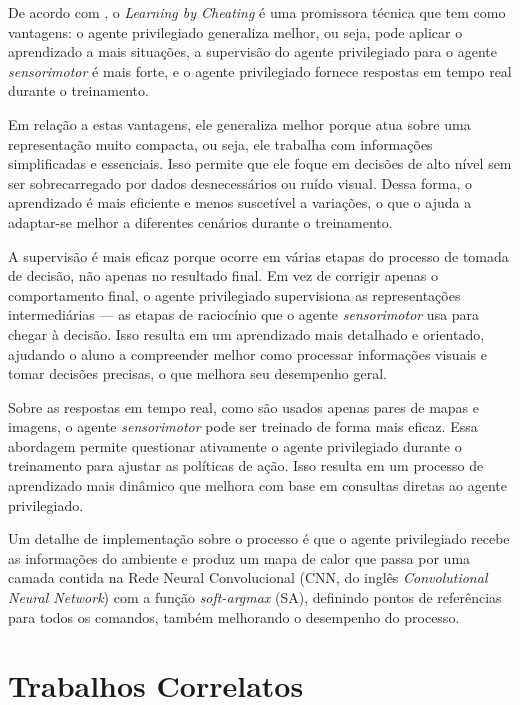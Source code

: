 \documentclass[a4paper,12pt,Times]{article}
\begin{document}
 De acordo com , o \textit{Learning by Cheating} é uma promissora técnica que tem como vantagens: o agente privilegiado generaliza melhor, ou seja, pode aplicar o aprendizado a mais situações, a supervisão do agente privilegiado para o agente \textit{sensorimotor} é mais forte, e o agente privilegiado fornece respostas em tempo real durante o treinamento.
 
 Em relação a estas vantagens, ele generaliza melhor porque atua sobre uma representação muito compacta, ou seja, ele trabalha com informações simplificadas e essenciais. Isso permite que ele foque em decisões de alto nível sem ser sobrecarregado por dados desnecessários ou ruído visual. Dessa forma, o aprendizado é mais eficiente e menos suscetível a variações, o que o ajuda a adaptar-se melhor a diferentes cenários durante o treinamento. 
 
 A supervisão é mais eficaz porque ocorre em várias etapas do processo de tomada de decisão, não apenas no resultado final. Em vez de corrigir apenas o comportamento final, o agente privilegiado supervisiona as representações intermediárias — as etapas de raciocínio que o agente \textit{sensorimotor} usa para chegar à decisão. Isso resulta em um aprendizado mais detalhado e orientado, ajudando o aluno a compreender melhor como processar informações visuais e tomar decisões precisas, o que melhora seu desempenho geral.

 Sobre as respostas em tempo real, como são usados apenas pares de mapas e imagens, o agente \textit{sensorimotor} pode ser treinado de forma mais eficaz. Essa abordagem permite questionar ativamente o agente privilegiado durante o treinamento para ajustar as políticas de ação. Isso resulta em um processo de aprendizado mais dinâmico que melhora com base em consultas diretas ao agente privilegiado.

Um detalhe de implementação sobre o processo é que o agente privilegiado recebe as informações do ambiente e produz um mapa de calor que passa por uma camada contida na Rede Neural Convolucional (CNN, do inglês \textit{Convolutional Neural Network}) com a função \textit{soft-argmax} (SA), definindo pontos de referências para todos os comandos, também melhorando o desempenho do processo.

\section{Trabalhos Correlatos}
\end{document}
